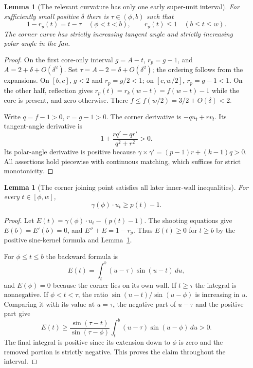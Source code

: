 \documentclass[11pt]{article}
\newtheorem{lemma}[theorem]{Lemma}
\begin{document}
\begin{lemma}[The relevant curvature has only one early super-unit interval]\label{lem:curvature}
For sufficiently small positive $\delta$ there is $\tau\in(\phi,b)$ such that
\[
 1-r_p(t)=t-\tau\quad(\phi<t<b),\qquad r_p(t)\le1\quad(b\le t\le w).
\]
The corner curve has strictly increasing tangent angle and strictly increasing polar angle in the fan.
\end{lemma}
\begin{proof}
On the first core-only interval $g=A-t$, $r_p=g-1$, and $A=2+\delta+O(\delta^2)$. Set $\tau=A-2=\delta+O(\delta^2)$; the ordering follows from the expansions. On $[b,c]$, $g<2$ and $r_p=g/2<1$; on $[c,w/2]$, $r_p=g-1<1$. On the other half, reflection gives $r_p(t)=r_k(w-t)=f(w-t)-1$ while the core is present, and zero otherwise. There $f\le f(w/2)=3/2+O(\delta)<2$.

Write $q=f-1>0$, $r=g-1>0$. The corner derivative is $-q u_t+r v_t$. Its tangent-angle derivative is
\[
 1+\frac{rq'-qr'}{q^2+r^2}>0.
\]
Its polar-angle derivative is positive because $\gamma\times\gamma'=(p-1)r+(k-1)q>0$. All assertions hold piecewise with continuous matching, which suffices for strict monotonicity.
\end{proof}

\begin{lemma}[The corner joining point satisfies all later inner-wall inequalities]\label{lem:joining}
For every $t\in[\phi,w]$,
\[
 \gamma(\phi)\cdot u_t\ge p(t)-1.
\]
\end{lemma}
\begin{proof}
Let $E(t)=\gamma(\phi)\cdot u_t-(p(t)-1)$. The shooting equations give $E(b)=E'(b)=0$, and $E''+E=1-r_p$. Thus $E(t)\ge0$ for $t\ge b$ by the positive sine-kernel formula and Lemma~\ref{lem:curvature}.

For $\phi\le t\le b$ the backward formula is
\[
 E(t)=\int_t^b(u-\tau)\sin(u-t)\,du,
\]
and $E(\phi)=0$ because the corner lies on its own wall. If $t\ge\tau$ the integral is nonnegative. If $\phi<t<\tau$, the ratio $\sin(u-t)/\sin(u-\phi)$ is increasing in $u$. Comparing it with its value at $u=\tau$, the negative part of $u-\tau$ and the positive part give
\[
 E(t)\ge\frac{\sin(\tau-t)}{\sin(\tau-\phi)}
 \int_t^b(u-\tau)\sin(u-\phi)\,du>0.
\]
The final integral is positive since its extension down to $\phi$ is zero and the removed portion is strictly negative. This proves the claim throughout the interval.
\end{proof}
\end{document}
